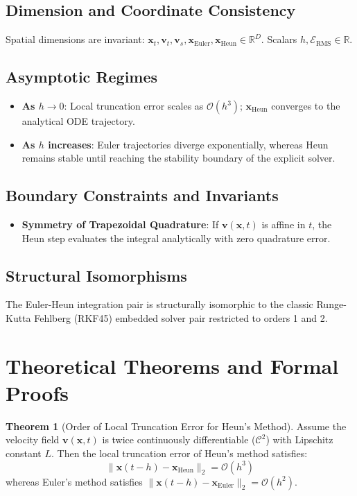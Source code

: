 \documentclass[11pt,a4paper]{article}
\theoremstyle{definition}
\newtheorem{theorem}{\textbf{Theorem}}[section]
\begin{document}
\subsection{Dimension and Coordinate Consistency}
Spatial dimensions are invariant: $\mathbf{x}_t, \mathbf{v}_t, \mathbf{v}_s, \mathbf{x}_{\text{Euler}}, \mathbf{x}_{\text{Heun}} \in \mathbb{R}^D$. Scalars $h, \mathcal{E}_{\text{RMS}} \in \mathbb{R}$.

\subsection{Asymptotic Regimes}
\begin{itemize}
    \item \textbf{As $h \to 0$}: Local truncation error scales as $\mathcal{O}(h^3)$; $\mathbf{x}_{\text{Heun}}$ converges to the analytical ODE trajectory.
    \item \textbf{As $h$ increases}: Euler trajectories diverge exponentially, whereas Heun remains stable until reaching the stability boundary of the explicit solver.
\end{itemize}

\subsection{Boundary Constraints and Invariants}
\begin{itemize}
    \item \textbf{Symmetry of Trapezoidal Quadrature}: If $\mathbf{v}(\mathbf{x}, t)$ is affine in $t$, the Heun step evaluates the integral analytically with zero quadrature error.
\end{itemize}

\subsection{Structural Isomorphisms}
The Euler-Heun integration pair is structurally isomorphic to the classic Runge-Kutta Fehlberg (RKF45) embedded solver pair restricted to orders 1 and 2.

\section{Theoretical Theorems and Formal Proofs}

\begin{theorem}[Order of Local Truncation Error for Heun's Method]
Assume the velocity field $\mathbf{v}(\mathbf{x}, t)$ is twice continuously differentiable ($\mathcal{C}^2$) with Lipschitz constant $L$. Then the local truncation error of Heun's method satisfies:
{\boldmath
\begin{equation}
\|\mathbf{x}(t - h) - \mathbf{x}_{\text{Heun}}\|_2 = \mathcal{O}(h^3)
\end{equation}
}
whereas Euler's method satisfies $\|\mathbf{x}(t - h) - \mathbf{x}_{\text{Euler}}\|_2 = \mathcal{O}(h^2)$.
\end{theorem}
\end{document}
